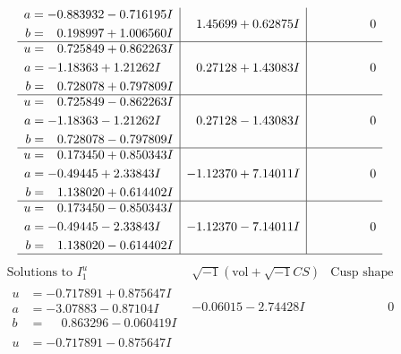 \documentclass[1p]{elsarticle_modified}
\theoremstyle{definition}
\newcommand{\I}{\sqrt{-1}}
\begin{document}
$$\begin{array}{c|c|c}
\begin{aligned}
a &= -0.883932 - 0.716195 I \\
b &= \phantom{-}0.198997 + 1.006560 I\end{aligned}
 & \phantom{-}1.45699 + 0.62875 I & \phantom{-0.000000 } 0 \\ \hline\begin{aligned}
u &= \phantom{-}0.725849 + 0.862263 I \\
a &= -1.18363 + 1.21262 I \\
b &= \phantom{-}0.728078 + 0.797809 I\end{aligned}
 & \phantom{-}0.27128 + 1.43083 I & \phantom{-0.000000 } 0 \\ \hline\begin{aligned}
u &= \phantom{-}0.725849 - 0.862263 I \\
a &= -1.18363 - 1.21262 I \\
b &= \phantom{-}0.728078 - 0.797809 I\end{aligned}
 & \phantom{-}0.27128 - 1.43083 I & \phantom{-0.000000 } 0 \\ \hline\begin{aligned}
u &= \phantom{-}0.173450 + 0.850343 I \\
a &= -0.49445 + 2.33843 I \\
b &= \phantom{-}1.138020 + 0.614402 I\end{aligned}
 & -1.12370 + 7.14011 I & \phantom{-0.000000 } 0 \\ \hline\begin{aligned}
u &= \phantom{-}0.173450 - 0.850343 I \\
a &= -0.49445 - 2.33843 I \\
b &= \phantom{-}1.138020 - 0.614402 I\end{aligned}
 & -1.12370 - 7.14011 I & \phantom{-0.000000 } 0\\
 \hline 
 \end{array}$$\newpage$$\begin{array}{c|c|c}  
\text{Solutions to }I^u_{1}& \I (\text{vol} + \sqrt{-1}CS) & \text{Cusp shape}\\
 \hline 
\begin{aligned}
u &= -0.717891 + 0.875647 I \\
a &= -3.07883 - 0.87104 I \\
b &= \phantom{-}0.863296 - 0.060419 I\end{aligned}
 & -0.06015 - 2.74428 I & \phantom{-0.000000 } 0 \\ \hline\begin{aligned}
u &= -0.717891 - 0.875647 I \\

\end{aligned}
\end{array}$$
\end{document}
